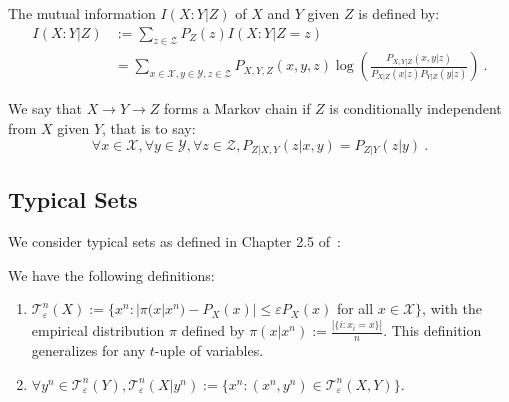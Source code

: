 \begin{definition}
  The mutual information $I(X:Y|Z)$ of $X$ and $Y$ given $Z$ is defined by:
    \begin{equation}
       \begin{aligned}
          I(X:Y|Z) &:= \sum_{z \in \mathcal{Z}}P_Z(z)I(X : Y|Z=z)\\
          &= \sum_{x \in \mathcal{X}, y \in \mathcal{Y}, z \in \mathcal{Z}}P_{X,Y,Z}(x,y,z)\log\left(\frac{P_{X,Y|Z}(x,y|z)}{P_{X|Z}(x|z)P_{Y|Z}(y|z)}\right)\ .
       \end{aligned}
     \end{equation}   
\end{definition}

\begin{definition}
We say that $X \rightarrow Y \rightarrow Z$ forms a Markov chain if $Z$ is conditionally independent from $X$ given $Y$, that is to say:
\[\forall x \in \mathcal{X},\forall y \in \mathcal{Y},\forall z \in \mathcal{Z}, P_{Z|X,Y}(z|x,y) = P_{Z|Y}(z|y)   \ .\]
\end{definition}

\subsection{Typical Sets}
\label{subsection:typicalSets}

We consider typical sets as defined in Chapter 2.5 of~\cite{GK11}:
      \begin{definition}
        We have the following definitions:
        \begin{enumerate}
        \item $\mathcal{T}^n_{\varepsilon}(X) := \{x^n : |\pi(x|x^n) - P_{X}(x)|\leq \varepsilon P_{X}(x)$ for all $x \in \mathcal{X}\}$, with the empirical distribution $\pi$ defined by $\pi(x|x^n) := \frac{|\{i : x_i=x\}|}{n}$. This definition generalizes for any $t$-uple of variables.
    \item $\forall y^n \in \mathcal{T}^n_{\varepsilon}(Y), \mathcal{T}^n_{\varepsilon}(X|y^n) := \{ x^n : (x^n,y^n) \in \mathcal{T}^n_{\varepsilon}(X,Y) \}$.
        \end{enumerate}
      \end{definition}

